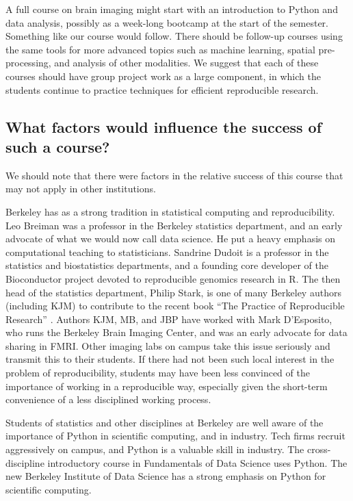 A full course on brain imaging might start with an introduction to Python and
data analysis, possibly as a week-long bootcamp at the start of the semester.
Something like our course would follow.  There should be follow-up courses
using the same tools for more advanced topics such as machine learning,
spatial pre-processing, and analysis of other modalities. We suggest that each
of these courses should have group project work as a large component, in which
the students continue to practice techniques for efficient reproducible
research.

\subsection{What factors would influence the success of such a course?}

We should note that there were factors in the relative success of this
course that may not apply in other institutions.

Berkeley has as a strong tradition in statistical computing and
reproducibility.  Leo Breiman was a professor in the Berkeley statistics
department, and an early advocate of what we would now call data science.  He
put a heavy emphasis on computational teaching to statisticians.  Sandrine
Dudoit is a professor in the statistics and biostatistics departments, and a
founding core developer of the Bioconductor project devoted to reproducible
genomics research in R.  The then head of the statistics department, Philip
Stark, is one of many Berkeley authors (including KJM) to contribute to the
recent book ``The Practice of Reproducible Research''
\citep{kitzes2017practice}. Authors KJM, MB, and JBP have worked with Mark
D'Esposito, who runs the Berkeley Brain Imaging Center, and was an early
advocate for data sharing in FMRI.  Other imaging labs on campus take this
issue seriously and transmit this to their students.  If
there had not been such local interest in the problem of reproducibility,
students may have been less convinced of the importance of
working in a reproducible way, especially given the short-term convenience
of a less disciplined working process.

Students of statistics and other disciplines at Berkeley are well aware of the
importance of Python in scientific computing, and in industry.  Tech firms
recruit aggressively on campus, and Python is a valuable skill in industry.
The cross-discipline introductory course in Fundamentals of Data Science uses
Python. The new Berkeley Institute of Data Science has a strong emphasis
on Python for scientific computing.

